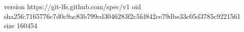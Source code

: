 version https://git-lfs.github.com/spec/v1
oid sha256:7165776c7d0c9ac83b799cd3046283f2c5fd842ce79dbe33c05d3785c9221561
size 160454
